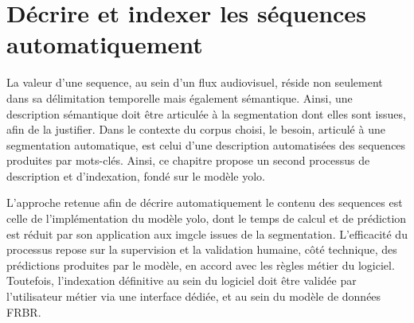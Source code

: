\chapter{\label{II_2}Décrire et indexer les séquences automatiquement} 


La valeur d'une \gls{sequence}, au sein d'un flux audiovisuel, réside non seulement dans sa délimitation temporelle mais également sémantique. Ainsi, une description sémantique doit être articulée à la segmentation dont elles sont issues, afin de la justifier. Dans le contexte du corpus choisi, le besoin, articulé à une segmentation automatique, est celui d'une description automatisées des \gls{sequence}s produites par mots-clés. Ainsi, ce chapitre propose un second processus de description et d'indexation, fondé sur le modèle \gls{yolo}.









L'approche retenue afin de décrire automatiquement le contenu des \gls{sequence}s est celle de l'implémentation du modèle \gls{yolo}, dont le temps de calcul et de prédiction est réduit par son application aux \gls{imgcle} issues de la segmentation. L'efficacité du processus repose sur la supervision et la validation humaine, côté technique, des prédictions produites par le modèle, en accord avec les règles métier du logiciel. Toutefois, l'indexation définitive au sein du logiciel doit être validée par l'utilisateur métier via une interface dédiée, et au sein du modèle de données \gls{FRBR}. 

 










